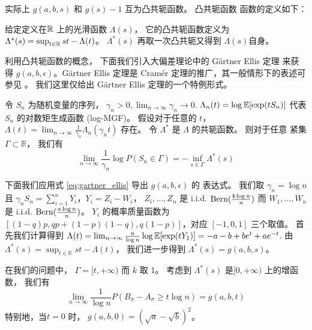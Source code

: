 \begin{remark}\label{re:g_beta}
实际上 $g(a,b,s)$ 和 $g(s)-1$ 互为凸共轭函数。
凸共轭函数
函数的定义如下：

给定定义在$\mathbb{R}$ 上的光滑函数 $\Lambda(s)$，
它的凸共轭函数定义为
$\Lambda^*(s) = \sup_{t \in \mathbb{R}} st-\Lambda(t)$。
$\Lambda^*(s)$ 再取一次凸共轭又得到 $\Lambda(s)$自身。

利用凸共轭函数的概念，
下面我们引入大偏差理论中的 Gärtner Ellis 定理
来获得 $g(a,b,\epsilon)$。Gärtner Ellis 定理是
Cramér 定理的推广，其一般情形下的表述可参见
\citet{dembo2009large}。
我们这里仅给出 Gärtner Ellis 定理的一个特例形式。

令 $S_n$ 为随机变量的序列，
$\gamma_n >0, \lim_{n\to \infty}\gamma_n \to 0$.
$\Lambda_n(t)=\log \operatorname{\mathbb{E}}[\exp(t S_n)]$ 代表 $S_n$ 的对数矩生成函数 (log-MGF)。
假设对于任意的 $t$，
$\Lambda(t) =\lim_{n\to \infty} \frac{1}{\gamma_n}\Lambda_n(\gamma_n t)$
存在。 令 $\Lambda^*$ 是 $\Lambda$ 的共轭函数。
则对于任意 紧集 $\Gamma \subset \mathbb{R}$，
我们有
\begin{equation}\label{eq:gartner_ellis}
\lim_{n\to \infty} \frac{1}{\gamma_n}\log P(S_n \in \Gamma) = -\inf_{s \in \Gamma} \Lambda^*(s)
\end{equation}

下面我们应用式 \eqref{eq:gartner_ellis}
导出 $g(a,b,\epsilon)$ 的
表达式。
我们取 $\gamma_n= \log n$ 且 $\gamma_n S_n = \sum_{i=1}^n Y_i$，$Y_i=Z_i - W_i$，
$Z_i, \dots, Z_n$ 是 i.i.d. $\operatorname{Bern}(\frac{b \log n}{n})$ 而 $W_1, \dots, W_n$ 是 i.i.d. $\operatorname{Bern}(\frac{a \log n}{n})$。
$Y_i$ 的概率质量函数为 $[(1-q)p, qp+(1-p)(1-q), q(1-p)]$，对应 $[-1,0,1]$ 三个取值。
首先我们计算得到 
$\Lambda(t) = \lim_{n\to \infty} \frac{n}{\log n} \log \operatorname{\mathbb{E}}[\exp(t Y_1)]
=-a-b+be^t  + ae^{-t}$. 由 $\Lambda^*(s) = \sup_{t\in\mathbb{R}} st - \Lambda(t)$，
我们进一步得到 $\Lambda^*(s) = g(a,b,s)$。

在我们的问题中， $\Gamma=[t, +\infty)$ 而 $k$ 取 1。
考虑到 $\Lambda^*(s)$  是$[0,+\infty)$ 上的增函数，
我们有
\begin{equation}
  \lim_{n\to \infty} \frac{1}{\log n} P(B_{\bar{\sigma}}-A_{\bar{\sigma}}\ge t \log n)
  = g(a,b,t)
\end{equation}
特别地，当$t=0$ 时， $g(a,b, 0) = (\sqrt{a} - \sqrt{b})^2$。
\end{remark}

